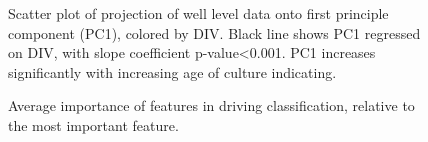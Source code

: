 \documentclass{article}\usepackage[]{graphicx}\usepackage[]{color}
\begin{document}
\begin{figure}
  \centering
  \caption{ Scatter plot of projection of well level data onto first principle component (PC1), colored by DIV. Black line shows PC1 regressed on DIV, with slope coefficient p-value<0.001. PC1 increases significantly with increasing age of culture indicating. 
}
\end{figure}

\begin{figure}
  \centering
  \caption{Average importance of features in driving classification,
    relative to the most important feature.}
\end{figure}
\end{document}
